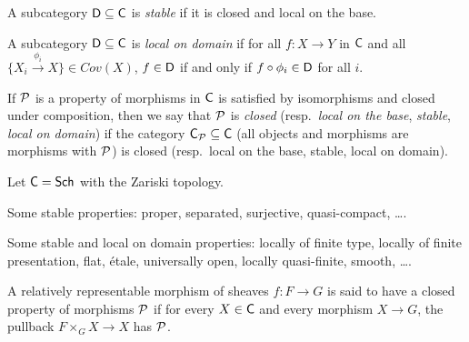 \begin{definition}
 A subcategory $\D\subseteq \C$ is \emph{stable} if it is closed and local on the base.
\end{definition}
\begin{definition}
 A subcategory $\D\subseteq \C$ is \emph{local on domain} if for all $f:X\to Y$ in $\C$ and all $\{X_i\xrightarrow{\phi_i} X\}\in Cov(X)$, $f\in \D$ if and only if $f\circ \phi_i\in \D$ for all $i$.
\end{definition}
\begin{definition}
 If $\P$ is a property of morphisms in $\C$ is satisfied by isomorphisms and closed under composition, then we say that $\P$ is \emph{closed} (resp.~\emph{local on the base}, \emph{stable}, \emph{local on domain}) if the category $\C_\P\subseteq \C$ (all objects and morphisms are morphisms with $\P$) is closed (resp.~local on the base, stable, local on domain).
\end{definition}
\begin{example}
 Let $\C=\sch$ with the Zariski topology.

 Some stable properties: proper, separated, surjective, quasi-compact, \dots.

 Some stable and local on domain properties: locally of finite type, locally of finite presentation, flat, \'etale, universally open, locally quasi-finite, smooth, \dots.
\end{example}
\begin{definition}
 A relatively representable morphism of sheaves $f\colon F\to G$ is said to have a closed property of morphisms $\P$ if for every $X\in \C$ and every morphism $X\to G$, the pullback $F\times_G X \to X$ has $\P$.
\end{definition}


